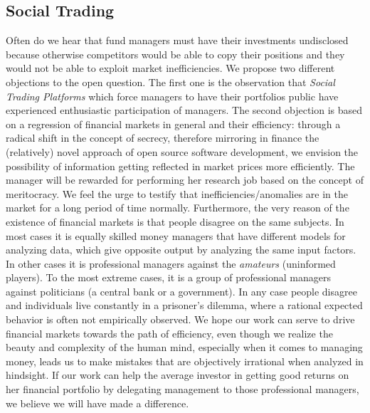 \documentclass[9pt,oneside]{amsart}
\begin{document}
\begin{multicols}{2}
\section{Social Trading} \label{ch:create}
Often do we hear that fund managers must have their investments undisclosed because otherwise competitors would be able to copy their positions and they would not be able to exploit market inefficiencies. We propose two different objections to the open question. The first one is the observation that \textit{Social Trading Platforms} which force managers to have their portfolios public have experienced enthusiastic participation of managers. The second objection is based on a regression of financial markets in general and their efficiency: through a radical shift in the concept of secrecy, therefore mirroring in finance the (relatively) novel approach of open source software development, we envision the possibility of information getting reflected in market prices more efficiently. The manager will be rewarded for performing her research job based on the concept of meritocracy. We feel the urge to testify that inefficiencies/anomalies are in the market for a long period of time normally. Furthermore, the very reason of the existence of financial markets is that people disagree on the same subjects. In most cases it is equally skilled money managers that have different models for analyzing data, which give opposite output by analyzing the same input factors. In other cases it is professional managers against the \textit{amateurs} (uninformed players). To the most extreme cases, it is a group of professional managers against politicians (a central bank or a government). In any case people disagree and individuals live constantly in a prisoner's dilemma, where a rational expected behavior is often not empirically observed.
We hope our work can serve to drive financial markets towards the path of efficiency, even though we realize the beauty and complexity of the human mind, especially when it comes to managing money, leads us to make mistakes that are objectively irrational when analyzed in hindsight.
If our work can help the average investor in getting good returns on her financial portfolio by delegating management to those professional managers, we believe we will have made a difference.


\end{multicols}
\end{document}
